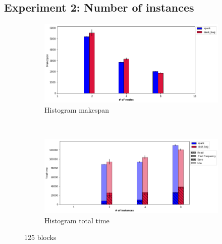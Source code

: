 \documentclass[conference]{IEEEtran}
\begin{document}

\subsection{Experiment 2: Number of instances}

\begin{figure}[!t]
    \centering
    \begin{subfigure}[b]{\columnwidth}
        \includegraphics[clip,width=\columnwidth]{images/histo_instance.png}%
        \caption{Histogram makespan}\label{fig:histo_ms_worker}
    \end{subfigure}
    \\
    \begin{subfigure}[b]{\columnwidth}
        \includegraphics[clip,width=\columnwidth]{images/histo_idle_instances.png}%
        \caption{Histogram total time}\label{fig:histo_tt_worker}
    \end{subfigure}
    \caption{125 blocks}
\end{figure}
\end{document}

